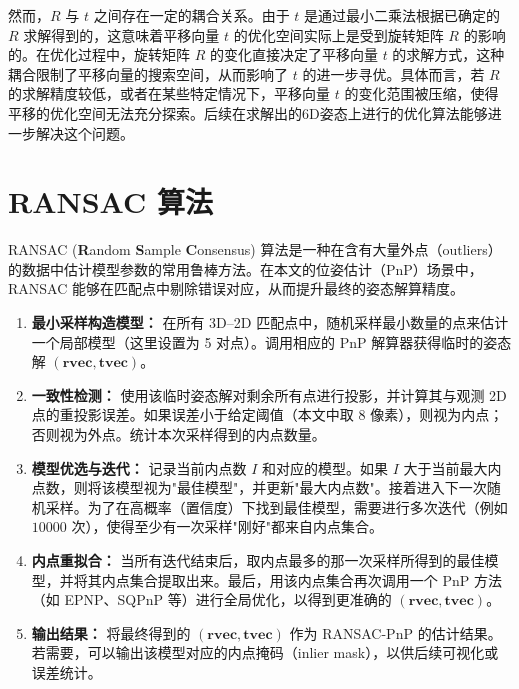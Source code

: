 然而，$R$ 与 $t$ 之间存在一定的耦合关系。由于 $t$ 是通过最小二乘法根据已确定的 $R$ 求解得到的，这意味着平移向量 $t$ 的优化空间实际上是受到旋转矩阵 $R$ 的影响的。在优化过程中，旋转矩阵 $R$ 的变化直接决定了平移向量 $t$ 的求解方式，这种耦合限制了平移向量的搜索空间，从而影响了 $t$ 的进一步寻优。具体而言，若 $R$ 的求解精度较低，或者在某些特定情况下，平移向量 $t$ 的变化范围被压缩，使得平移的优化空间无法充分探索。后续在求解出的6D姿态上进行的优化算法能够进一步解决这个问题。



\section{RANSAC 算法}
\label{sec:RANSAC-TRO-SQPnP:RANSAC}

RANSAC (\textbf{R}andom \textbf{S}ample \textbf{C}onsensus) 算法是一种在含有大量外点（outliers）的数据中估计模型参数的常用鲁棒方法。在本文的位姿估计（PnP）场景中，RANSAC 能够在匹配点中剔除错误对应，从而提升最终的姿态解算精度。

\begin{enumerate}
	\item \textbf{最小采样构造模型：}  
	在所有 3D--2D 匹配点中，随机采样最小数量的点来估计一个局部模型（这里设置为 5 对点）。调用相应的 PnP 解算器获得临时的姿态解 $(\mathbf{rvec}, \mathbf{tvec})$。
	
	\item \textbf{一致性检测：}  
	使用该临时姿态解对剩余所有点进行投影，并计算其与观测 2D 点的重投影误差。如果误差小于给定阈值（本文中取 $8$ 像素），则视为内点；否则视为外点。统计本次采样得到的内点数量。
	
	\item \textbf{模型优选与迭代：}  
	记录当前内点数 $I$ 和对应的模型。如果 $I$ 大于当前最大内点数，则将该模型视为"最佳模型"，并更新"最大内点数"。接着进入下一次随机采样。为了在高概率（置信度）下找到最佳模型，需要进行多次迭代（例如 $10000$ 次），使得至少有一次采样"刚好"都来自内点集合。
	
	\item \textbf{内点重拟合：}  
	当所有迭代结束后，取内点最多的那一次采样所得到的最佳模型，并将其内点集合提取出来。最后，用该内点集合再次调用一个 PnP 方法（如 EPNP、SQPnP 等）进行全局优化，以得到更准确的 $(\mathbf{rvec}, \mathbf{tvec})$。
	
	\item \textbf{输出结果：}  
	将最终得到的 $(\mathbf{rvec}, \mathbf{tvec})$ 作为 RANSAC-PnP 的估计结果。若需要，可以输出该模型对应的内点掩码（inlier mask），以供后续可视化或误差统计。
\end{enumerate}

